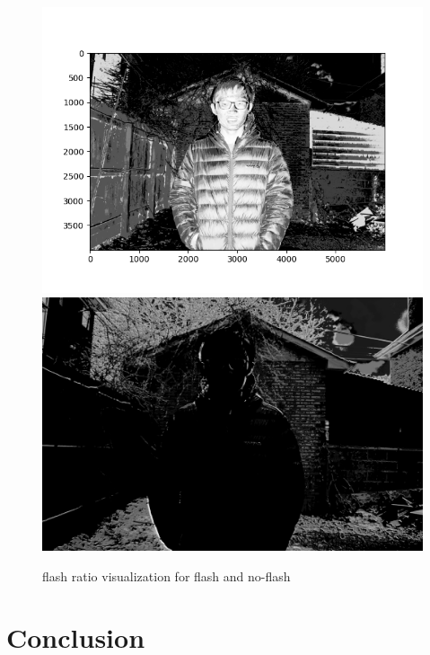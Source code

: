 \documentclass[final]{cvpr}
\begin{document}
\begin{figure}[ht]
   \centering
   \includegraphics[scale=0.035]{../data/output/arthas_nf_ratio.png}
   \includegraphics[scale=0.035]{../data/output/arthas_f_ratio.png}
   \caption{flash ratio visualization for flash and no-flash}
\end{figure}
\section{Conclusion}
\end{document}
